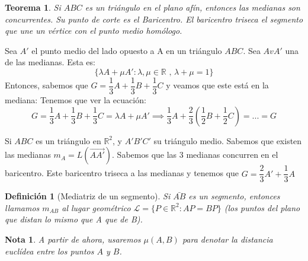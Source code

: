 \documentclass[11pt, a4paper, titlepage]{article}
\makeatletter
\renewenvironment{proof}[1][\proofname] {\vspace{-15pt}\par\pushQED{\qed}\normalfont\topsep6\p@\@plus6\p@\relax\trivlist\item[\hskip\labelsep\it#1\@addpunct{.}]\ignorespaces}{\popQED\endtrivlist\@endpefalse}
\newcommand{\R}{\mathbb{R}}
\renewcommand{\vec}{\overrightarrow}
\theoremstyle{theorem-style}
\newtheorem*{nth}{Teorema}
\theoremstyle{definition-style}
\newtheorem*{ndef}{Definición}
\theoremstyle{remark-style}
\newtheorem*{nota}{Nota}
\theoremstyle{example-style}
\makeatother
\begin{document}
\begin{nth}
	Si $ABC$ es un triángulo en el plano afín, entonces las medianas son concurrentes. Su punto de corte es el Baricentro. El baricentro triseca el segmento que une un vértice con el punto medio homólogo.


\end{nth}


	
	\begin{proof}
	Sea $A'$ el punto medio del lado opuesto a A en un triángulo $ABC$. Sea $AvA'$ una de las medianas. Esta es:
	\[
	\{\lambda A + \mu A': \lambda, \mu \in \R \text{ , } \lambda+\mu = 1\}
	\]
	Entonces, sabemos que $G = \dfrac{1}{3} A +  \dfrac{1}{3} B +  \dfrac{1}{3} C$ y veamos que este está en la mediana: Tenemos que ver la ecuación:
	\[
	G = \dfrac{1}{3} A +  \dfrac{1}{3} B +  \dfrac{1}{3} C = \lambda A + \mu A'  \implies \dfrac{1}{3}A + \dfrac{2}{3}(\dfrac{1}{2}B+\dfrac{1}{2}C) = ... = G
	\]

\end{proof}

Si $ABC$ es un triángulo en $\R^2$, y $A'B'C'$ su triángulo medio. Sabemos que existen las medianas $m_A = L(\vec{AA'})$. Sabemos que las 3 medianas concurren en el baricentro. Este baricentro triseca a las medianas y tenemos que $G = \dfrac{2}{3}A' + \dfrac{1}{3}A$

\begin{ndef}[Mediatriz de un segmento]
	Si $\bar{AB}$ es un segmento, entonces llamamos $m_{AB}$  al lugar geométrico $\mathcal{L}=\{P \in \R^2 : AP = BP\}$ (los puntos del plano que distan lo mismo que A que de B).
\end{ndef}
\begin{nota}
	A partir de ahora, usaremos $\mu(A,B)$ para denotar la distancia euclídea entre los puntos $A$ y $B$.
\end{nota}
\end{document}
